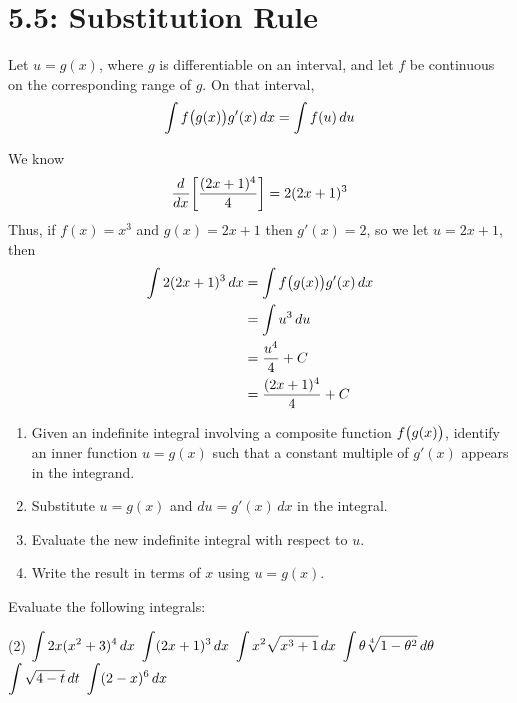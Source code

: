 \documentclass[mathNotesPreamble]{subfiles}
\begin{document}
\section{5.5: Substitution Rule}
\vspace*{-\baselineskip}
  \begin{thmBox*}
    Let $u=g(x)$, where $g$ is differentiable on an interval, and let $f$ be continuous on the corresponding range of $g$. On that interval,
    \[\int f{\left(g(x)\vphantom{g(x)^1}\right)}g'(x)\,dx=\int f(u)\,du\]
  \end{thmBox*}

  \begin{ex*}
    We know
      \[{\frac{d^{}}{dx^{}}}{\left[\frac{(2x+1)^4}{4}\right]}=2(2x+1)^3\]
    Thus, if $f(x)=x^3$ and $g(x)=2x+1$ then $g'(x)=2$, so we let $u=2x+1$, then
    \begin{align*}
      \int 2(2x+1)^3\,dx&=\int f{\left(g(x)\vphantom{g(x)^1}\right)}g'(x)\,dx\\
        &=\int u^3\,du\\
        &=\frac{u^4}{4}+C\\
        &=\frac{(2x+1)^4}{4}+C
    \end{align*}
  \end{ex*}
  
  \begin{thmBox*}
    \begin{enumerate}
      \item Given an indefinite integral involving a composite function $f{\left(g(x)\vphantom{g(x)^1}\right)}$, identify an inner function $u=g(x)$ such that a constant multiple of $g'(x)$ appears in the integrand.
      \item Substitute $u=g(x)$ and $du=g'(x)\,dx$ in the integral.
      \item Evaluate the new indefinite integral with respect to $u$.
      \item Write the result in terms of $x$ using $u=g(x)$.
    \end{enumerate}
  \end{thmBox*}
  \pagebreak
  
  \begin{ex*}
    Evaluate the following integrals:
  \end{ex*}
  \begin{tasks}[after-item-skip=\stretch{1}](2)
    \task $\displaystyle\int 2x(x^2+3)^4\,dx$
    \task $\displaystyle\int (2x+1)^3\, dx$
    \task $\displaystyle\int x^2\sqrt{x^3+1}\, dx$
    \task $\displaystyle\int \theta\sqrt[4]{1-\theta^2}\,d\theta$
    \task $\displaystyle\int\sqrt{4-t}\,dt$
    \task $\displaystyle\int (2-x)^6\,dx$
  \end{tasks}
  \pagebreak
  
\end{document}
